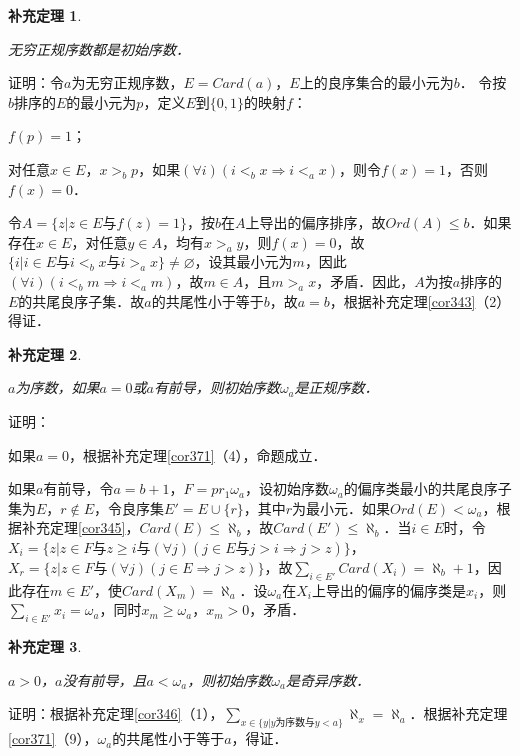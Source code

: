 \documentclass[12pt, a4paper, oneside]{book}
\newtheorem{cor}{补充定理}
\begin{document}
			\begin{cor}\label{cor372}
				\hfill\par
				无穷正规序数都是初始序数．
			\end{cor}
			证明：令$a$为无穷正规序数，$E=Card(a)$，$E$上的良序集合的最小元为$b$．
			令按$b$排序的$E$的最小元为$p$，定义$E$到$\{0, 1\}$的映射$f$：
			\par
			$f(p)=1$；
			\par
			对任意$x\in E$，$x>_bp$，如果$(\forall i)(i<_bx\Rightarrow i<_ax)$，则令$f(x)=1$，否则$f(x)=0$．
			\par
			令$A=\{z|z\in E\text{与}f(z)=1\}$，按$b$在$A$上导出的偏序排序，故$Ord(A)\leq b$．如果存在$x\in E$，对任意$y\in A$，均有$x>_ay$，则$f(x)=0$，故$\{i|i\in E\text{与}i<_bx\text{与}i>_ax\}\neq \varnothing$，设其最小元为$m$，因此$(\forall i)(i<_bm\Rightarrow i<_am)$，故$m\in A$，且$m>_ax$，矛盾．因此，$A$为按$a$排序的$E$的共尾良序子集．故$a$的共尾性小于等于$b$，故$a=b$，根据补充定理\ref{cor343}（2）得证．
			
			\begin{cor}\label{cor373}
				\hfill\par
				$a$为序数，如果$a=0$或$a$有前导，则初始序数$\omega_a$是正规序数．
			\end{cor}
			证明：
			\par
			如果$a=0$，根据补充定理\ref{cor371}（4），命题成立．
			\par
			如果$a$有前导，令$a=b+1$，$F=pr_1\omega_a$，设初始序数$\omega_a$的偏序类最小的共尾良序子集为$E$，$r\notin E$，令良序集$E'=E\cup\{r\}$，其中$r$为最小元．如果$Ord(E)<\omega_a$，根据补充定理\ref{cor345}，$Card(E)\leq \aleph_b$，故$Card(E')\leq \aleph_b$．当$i\in E$时，令$X_i=\{z|z\in F\text{与}z\geq i\text{与}(\forall j)(j\in E\text{与}j>i\Rightarrow j>z)\}$，$X_r=\{z|z\in F\text{与}(\forall j)(j\in E\Rightarrow j>z)\}$，故$\sum\limits_{i\in E'}Card(X_i)=\aleph_b+1$，因此存在$m\in E'$，使$Card(X_m)=\aleph_a$．设$\omega_a$在$X_i$上导出的偏序的偏序类是$x_i$，则$\sum\limits_{i\in E'}x_i=\omega_a$，同时$x_m\geq \omega_a$，$x_m>0$，矛盾．
			
			\begin{cor}\label{cor374}
				\hfill\par
				$a>0$，$a$没有前导，且$a<\omega_a$，则初始序数$\omega_a$是奇异序数．
			\end{cor}
			证明：根据补充定理\ref{cor346}（1），$\sum\limits_{x\in \{y|y\text{为序数}\text{与}y<a\}}\aleph_x=\aleph_a$．根据补充定理\ref{cor371}（9），$\omega_a$的共尾性小于等于$a$，得证．
			
\end{document}
